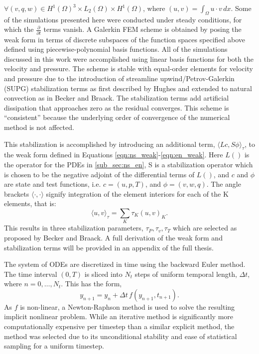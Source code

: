 $\forall (v,q,w) \in H^1(\Omega)^3 \times L_2(\Omega) \times
H^1(\Omega)$, where $(u,v) = \int_\Omega u \cdot v \, dx$.  
Some of the simulations presented here were conducted under
steady conditions, for which the $\frac{\partial}{\partial t}$ terms
vanish. A Galerkin FEM scheme is obtained by posing the weak form in
terms of discrete subspaces of the function spaces specified above
defined using piecewise-polynomial basis functions. All of the
simulations discussed in this work were accomplished using 
linear basis functions for both the velocity and pressure.
The scheme is
stable with equal-order elements for velocity and pressure due to the
introduction of streamline upwind/Petrov-Galerkin (SUPG) stabilization
terms as first described by Hughes\cite{Hughes198685,supg} and extended
to natural convection as in Becker and Braack\cite{Becker2002428}. The
stabilization terms add artificial dissipation that approaches zero as the
residual converges. This scheme is ``consistent'' because the
underlying order of convergence of the numerical method is not 
affected\cite{hughes2000finite}. 

This stabilization is accomplished by introducing an additional term,
$\langle Lc,S\phi \rangle_\tau$, to the weak form defined in Equations
\ref{eqn:ns_weak}-\ref{eqn:en_weak}. Here $L()$ is the operator for the PDEs
in \ref{sub_sec:ns_en}, S is a stabilization operator
which is chosen to be the negative adjoint of the differential terms of
$L()$, and $c$ and $\phi$ are state and test functions, i.e. 
$ c= (u,p,T)$, and $\phi = ( v,w,q )$. 
The angle brackets $\langle \cdot,\cdot \rangle$ signify integration of
the element interiors for each of the K elements, that is:
\begin{equation}
 \langle u,v \rangle_\tau = \sum_K \tau_K(u,v)_K.
\end{equation}
This results in three stabilization parameters, $\tau_P, \tau_v, \tau_T$ 
which are selected as proposed by Becker and Braack. 
A full derivation of the weak form and stabilization terms will be
provided in an appendix of the full thesis. 

The system of ODEs are discretized in time using the 
backward Euler method\cite{moin2010fundamentals}. The time interval
$(0,T)$ is sliced into $N_t$ steps of 
uniform temporal length,  $\Delta t$, where $n = 0,\dots,N_t$. 
This has the form, 
\begin{equation}
 y_{n+1} = y_n + \Delta t \, f(y_{n+1},t_{n+1}).
\end{equation}
As $f$ is non-linear, a Newton-Raphson method is used to solve the
resulting implicit nonlinear problem. While an iterative method is
significantly more computationally expensive per timestep than a similar
explicit method, the method was selected due to its unconditional
stability and ease of statistical sampling for a uniform timestep. 


